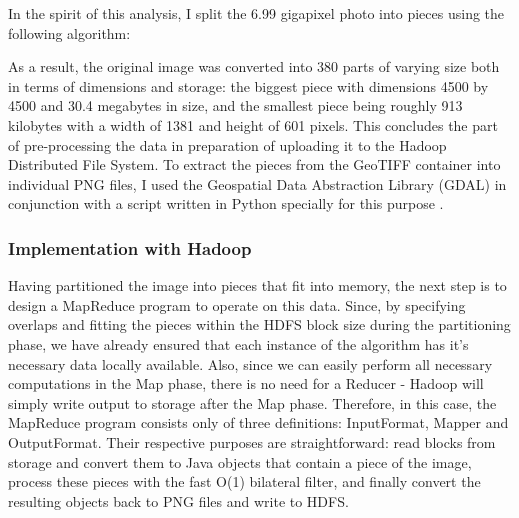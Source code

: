 \documentclass [12pt,a4paper]{report}
\begin{document}
In the spirit of this analysis, I split the 6.99 gigapixel photo into pieces using the following algorithm:

\begin{center}
\begin{algorithm}[H]
\end{algorithm}
\end{center}

As a result, the original image was converted into 380 parts of varying size both in terms of dimensions and storage: the biggest piece with dimensions 4500 by 4500 and 30.4 megabytes in size, and the smallest piece being roughly 913 kilobytes with a width of 1381 and height of 601 pixels. This concludes the part of pre-processing the data in preparation of uploading it to the Hadoop Distributed File System.
To extract the pieces from the GeoTIFF container into individual PNG files, I used the Geospatial Data Abstraction Library (GDAL) in conjunction with a script written in Python specially for this purpose \cite{gdal}.

\subsubsection{Implementation with Hadoop}

Having partitioned the image into pieces that fit into memory, the next step is to design a MapReduce program to operate on this data. Since, by specifying overlaps and fitting the pieces within the HDFS block size during the partitioning phase, we have already ensured that each instance of the algorithm has it's necessary data locally available. Also, since we can easily perform all necessary computations in the Map phase, there is no need for a Reducer - Hadoop will simply write output to storage after the Map phase. Therefore, in this case, the MapReduce program consists only of three definitions: InputFormat, Mapper and OutputFormat. Their respective purposes are straightforward: read blocks from storage and convert them to Java objects that contain a piece of the image, process these pieces with the fast O(1) bilateral filter, and finally convert the resulting objects back to PNG files and write to HDFS. 
\end{document}

